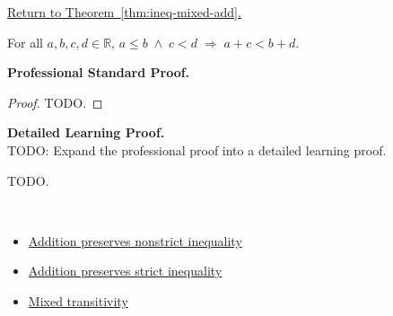 \newpage
{}
\label{prf:ineq-mixed-add}

\begin{remark*}[Return]
\hyperref[thm:ineq-mixed-add]{Return to Theorem~\ref*{thm:ineq-mixed-add}.}
\end{remark*}

\begin{theorem*}
For all $a, b, c, d \in \mathbb{R}$,
$a \le b \;\land\; c < d \;\Rightarrow\; a + c < b + d$.
\end{theorem*}

\textbf{Professional Standard Proof.}~\\
\begin{proof}
TODO.
\end{proof}

\textbf{Detailed Learning Proof.}~\\
TODO: Expand the professional proof into a detailed learning proof.


\begin{remark*}
TODO.
\end{remark*}

\begin{remark*}[Dependencies]~\\
\begin{itemize}
  \item \hyperref[thm:ineq-nonstrict-add-both-sides]{Addition preserves nonstrict inequality}
  \item \hyperref[thm:ineq-add-both-sides]{Addition preserves strict inequality}
  \item \hyperref[thm:ineq-transitivity-mixed]{Mixed transitivity}
\end{itemize}
\end{remark*}
